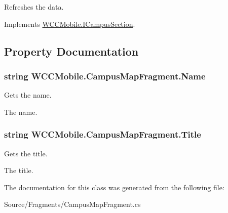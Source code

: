 Refreshes the data. 



Implements \hyperlink{interface_w_c_c_mobile_1_1_i_campus_section}{W\+C\+C\+Mobile.\+I\+Campus\+Section}.



\subsection{Property Documentation}
\subsubsection[{\texorpdfstring{Name}{Name}}]{\setlength{\rightskip}{0pt plus 5cm}string W\+C\+C\+Mobile.\+Campus\+Map\+Fragment.\+Name\hspace{0.3cm}{\ttfamily [get]}}\hypertarget{class_w_c_c_mobile_1_1_campus_map_fragment_a239196a5a923d1ac5e9d66464cb39888}{}\label{class_w_c_c_mobile_1_1_campus_map_fragment_a239196a5a923d1ac5e9d66464cb39888}


Gets the name. 

The name. 
\subsubsection[{\texorpdfstring{Title}{Title}}]{\setlength{\rightskip}{0pt plus 5cm}string W\+C\+C\+Mobile.\+Campus\+Map\+Fragment.\+Title\hspace{0.3cm}{\ttfamily [get]}}\hypertarget{class_w_c_c_mobile_1_1_campus_map_fragment_aff146bee1b2f41f80344c3621006d833}{}\label{class_w_c_c_mobile_1_1_campus_map_fragment_aff146bee1b2f41f80344c3621006d833}


Gets the title. 

The title. 

The documentation for this class was generated from the following file\+:\begin{DoxyCompactItemize}
\item 
Source/\+Fragments/Campus\+Map\+Fragment.\+cs\end{DoxyCompactItemize}
